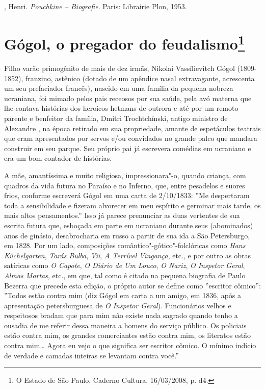 , Henri. \emph{Pouchkine -- Biografie}. Paris: Librairie Plon,
1953.

\chapter{Gógol, o pregador do feudalismo\footnote{O Estado de São Paulo,
  Caderno Cultura, 16/03/2008, p. d4.}}

Filho varão primogênito de mais de dez irmãs, Nikolai Vassílievitch
Gógol (1809-1852), franzino, astênico (dotado de um apêndice nasal
extravagante, acrescenta um seu prefaciador francês), nascido em uma
família da pequena nobreza ucraniana, foi mimado pelos pais receosos por
sua saúde, pela avó materna que lhe contava histórias dos heroicos
hetmans de outrora e até por um remoto parente e benfeitor da família,
Dmitri Trochtchínski, antigo ministro de Alexandre , na época retirado
em sua propriedade, amante de espetáculos teatrais que eram apresentados
por servos e/ou convidados no grande palco que mandara construir em seu
parque. Seu próprio pai já escrevera comédias em ucraniano e era um bom
contador de histórias.

A mãe, amantíssima e muito religiosa, impressionara"-o, quando criança,
com quadros da vida futura no Paraíso e no Inferno, que, entre pesadelos
e suores frios, conforme escreverá Gógol em uma carta de 2/10/1833: ''Me
despertaram toda a sensibilidade e fizeram alvorecer em meu espírito e
germinar mais tarde, os mais altos pensamentos.'' Isso já parece
prenunciar as duas vertentes de sua escrita futura que, esboçada em
parte em ucraniano durante seus (abominados) anos de ginásio,
desabrocharia em russo a partir de sua ida a São Petersburgo, em 1828.
Por um lado, composições romântico"-gótico"-folclóricas como \emph{Hans
Küchelgarten}, \emph{Tarás Bulba}, \emph{Vii}, \emph{A Terrível Vingança}, etc., e por outro
as obras satíricas como \emph{O Capote}, \emph{O Diário de Um Louco}, \emph{O Nariz}, \emph{O
Inspetor Geral}, \emph{Almas Mortas}, etc., em que, tal como é citado na pequena
biografia de Paulo Bezerra que precede esta edição, o próprio autor se
define como ''escritor cômico'': ''Todos estão contra mim (diz Gógol em
carta a um amigo, em 1836, após a apresentação petersburguesa de \emph{O
Inspetor Geral}). Funcionários velhos e respeitosos bradam que para mim
não existe nada sagrado quando tenho a ousadia de me referir dessa
maneira a homens do serviço público. Os policiais estão contra mim, os
grandes comerciantes estão contra mim, os literatos estão contra mim\ldots{}
Agora eu vejo o que significa ser escritor cômico. O mínimo indício de
verdade e camadas inteiras se levantam contra você.''

